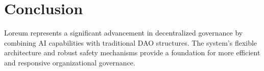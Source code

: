 \documentclass[12pt]{article}
\begin{document}
\section{Conclusion}
Loreum represents a significant advancement in decentralized governance by combining AI capabilities with traditional DAO structures. The system's flexible architecture and robust safety mechanisms provide a foundation for more efficient and responsive organizational governance.
\end{document}
